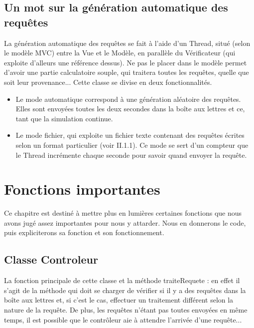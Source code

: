 \documentclass[a4paper, titlepage]{report}
\begin{document}
\section{Un mot sur la génération automatique des requêtes}
La génération automatique des requêtes se fait à l'aide d'un Thread, situé (selon le modèle MVC) entre la Vue et le Modèle, en parallèle du Vérificateur (qui exploite d'alleurs une référence dessus). Ne pas le placer dans le modèle permet d'avoir une partie calculatoire souple, qui traitera toutes les requêtes, quelle que soit leur provenance... Cette classe se divise en deux fonctionnalités.
\begin{itemize}
\item Le mode automatique correspond à une génération aléatoire des requêtes. Elles sont envoyées toutes les deux secondes dans la boîte aux lettres et ce, tant que la simulation continue.
\item Le mode fichier, qui exploite un fichier texte contenant  des requêtes écrites selon un format particulier (voir II.1.1). Ce mode se sert d'un compteur que le Thread incrémente chaque seconde pour savoir quand envoyer la requête.
\end{itemize}
\chapter{Fonctions importantes}
Ce chapitre est destiné à mettre plus en lumières certaines fonctions que nous avons jugé assez importantes pour nous y attarder. Nous en donnerons le code, puis expliciterons sa fonction et son fonctionnement.
\section{Classe Controleur}
La fonction principale de cette classe et la méthode traiteRequete : en effet il s'agit de la méthode qui doit se charger de vérifier si il y a des requêtes dans la boîte aux lettres et, si c'est le cas, effectuer un traitement différent selon la nature de la requête. De plus, les requêtes n'étant pas toutes envoyées en même temps, il est possible que le contrôleur aie à attendre l'arrivée d'une requête...\\
\end{document}
